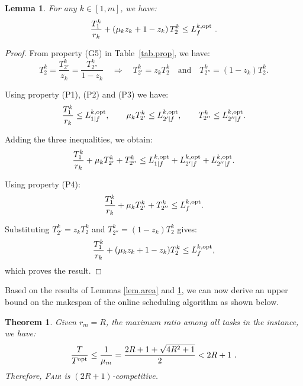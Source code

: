 \documentclass{article}
\newtheorem{lemma}{Lemma}
\newtheorem{theorem}{Theorem}
\newcommand\fair{\textsc{Fair}\xspace}
\newcommand\ratio{R\xspace}
\newcommand\rratio{r\xspace}
\newcommand\opt{\textnormal{opt}\xspace}
\begin{document}
\begin{lemma}\label{lem.path}
For any $k \in [1,m]$, we have:
\begin{equation}\label{CP}
\frac{T_1^k}{\rratio_k} + \left(\mu_k z_k + 1 - z_k\right) T_2^k \le L_f^{k,\opt} \ .
\end{equation}
\end{lemma}

\begin{proof}
From property (G5) in Table~\ref{tab.prop}, we have:
\[
T_2^k = \frac{T_{2'}^k}{z_k} = \frac{T_{2''}^k}{1 - z_k}
\quad \Rightarrow \quad
T_{2'}^k = z_k T_2^k \quad \text{and} \quad T_{2''}^k = (1 - z_k) T_2^k.
\]

Using property (P1), (P2) and (P3) we have:
\[
\frac{T_1^k}{\rratio_k} \le L_{1|f}^{k,\opt}, \qquad
\mu_k T_{2'}^k \le L_{2'|f}^{k,\opt}, \qquad 
T_{2''}^k \le L_{2''|f}^{k,\opt}.
\]

Adding the three inequalities, we obtain:
\[
\frac{T_1^k}{\rratio_k} + \mu_k T_{2'}^k + T_{2''}^k \le L_{1|f}^{k,\opt} + L_{2'|f}^{k,\opt} + L_{2''|f}^{k,\opt}.
\]

Using property (P4):
\[
\frac{T_1^k}{\rratio_k} + \mu_k T_{2'}^k + T_{2''}^k \le L_f^{k,\opt}.
\]

Substituting \(T_{2'}^k = z_k T_2^k\) and \(T_{2''}^k = (1 - z_k) T_2^k\) gives:
\[
\frac{T_1^k}{\rratio_k} + (\mu_k z_k + 1 - z_k) T_2^k \le L_f^{k,\opt},
\]
which proves the result.
\end{proof}


Based on the results of Lemmas \ref{lem.area} and \ref{lem.path}, we can now derive an upper bound on the makespan of the online scheduling algorithm as shown below.
\begin{theorem}\label{lem.makespan}
Given $\rratio_m=\ratio$, the maximum ratio among all tasks in the instance, we have:
\begin{equation}\label{eq.makespan}
\frac{T}{T^{\opt}} \leq \frac{1}{\mu_m} = \frac{2\ratio+1+\sqrt{4\ratio^2+1}}{2}<2\ratio+1 \ .
\end{equation}
Therefore, \fair is $(2\ratio+1)$-competitive.
\end{theorem}
\end{document}
